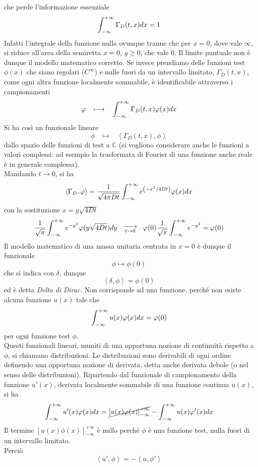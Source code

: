 che perde l'informazione essenziale
\[
	\int_{- \infty}^{+ \infty} \Gamma_D(t,x) dx= 1
\]
Infatti l'integrale della funzione nulla ovunque tranne che per $x=0$, dove vale
$\infty$, si riduce all'area della semiretta $x=0$, $y\geq 0$, che vale
0. Il limite puntuale non \`e dunque il modello matematico corretto.
Se invece prendiamo delle funzioni test $\phi (x)$ che siano regolari
($C^\infty$) e nulle fuori da un intervallo limitato, $\Gamma_D(t,x)$,
come ogni altra funzione localmente sommabile, \`e identificabile attraverso
i campionamenti
\[
	\varphi \;\;\; \longmapsto \;\;\;
	\int_{- \infty}^{+ \infty} \Gamma_D(t,x) \varphi(x) dx
\]
Si ha cos\`i un funzionale lineare
\[
	\phi \;\;\; \longmapsto \;\;\;
	\left< \Gamma_D(t,x), \phi \right>
\]
dallo spazio delle funzioni di test a $\mathbb{C}$ (si vogliono considerare
anche le funzioni a valori complessi: ad esempio la trasformata di Fourier di
una funzione anche reale \`e in generale complessa).\\
Mandando $t \to 0$, si ha
\[
	\left< \Gamma_D, \varphi \right>=
	\frac{1}{\sqrt{4 \pi D t}} \int_{- \infty}^{+ \infty}
	e^{\left( -x^2/4Dt \right)}
	\varphi (x) dx
\]
con la sostituzione $x= y \sqrt{4Dt}$
\[
	\frac{1}{\sqrt{\pi}} \int_{- \infty}^{+ \infty}
	e^{-y^2}\varphi (y\sqrt{4Dt}) dy
	\;\;\;
	\substack{\xrightarrow{\hspace*{5mm}} \\ t\rightarrow 0}
	\;\;\;
	\varphi(0)\frac{1}{\sqrt{\pi}}
	\int_{- \infty}^{+ \infty} e^{-y^2}= \varphi(0)
\]
Il modello matematico di una massa unitaria centrata in $x=0$ \`e dunque
il funzionale
\[
	\phi \longmapsto \phi(0)
\]
che si indica con $\delta$, dunque
\[
	\left< \delta, \phi \right> = \phi(0)
\]
ed \`e detta \textit{Delta di Dirac}.
Non corrisponde ad una funzione, perch\'e non esiste alcuna funzione $u(x)$
tale che
\[
	\int_{- \infty}^{+ \infty} u(x)\varphi(x)dx= \varphi (0)
\]
per ogni funzione test $\phi$.\\
Questi funzionali lineari, muniti di una opportuna nozione di continuit\`a
rispetto a $\phi$, si chiamano distribuzioni. Le distribuzioni sono
derivabili di ogni ordine definendo una opportuna nozione di derivata,
detta anche derivata debole (o nel senso delle distribuzioni).
Ripartendo dal funzionale di campionamento della funzione $u'(x)$, derivata
localmente sommabile di una funzione continua $u(x)$, si ha
\[
	\int_{- \infty}^{+ \infty} u'(x)\varphi(x) dx= \cancel{\left[ u(x)\varphi(x) \right]^
	{+\infty}_{-\infty}}- \int_{- \infty}^{+ \infty} u(x)\varphi ' (x) dx
\]
Il termine $\left[ u(x)\phi(x) \right]^{+\infty}_{-\infty}$ \`e nullo perch\'e
$\phi$ \`e una funzione test, nulla fuori di un intervallo limitato.\\
Perci\`o
\[
	\left< u', \phi \right>= - \left< u, \phi ' \right>
\]
